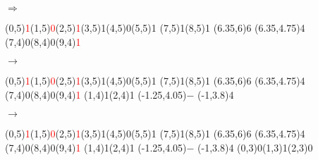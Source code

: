 \documentclass[11pt,a4paper]{article}
\begin{document}
\begin{center}
\begin{table}[ht!]
\begin{minipage}{0.1\textwidth}
$ \Rightarrow $

  \end{minipage}
\end{table}


\begin{table}[ht!]
  \centering
  \begin{minipage}{0.15\textwidth}

\par\vspace{6\oplineheight}
\oplput(0,5){\textcolor{red}{1}}\oplput(1,5){\textcolor{red}{0}}\oplput(2,5){\textcolor{red}{1}}\oplput(3,5){1}\oplput(4,5){0}\oplput(5,5){1}
\oplput(7,5){1}\oplput(8,5){1}
\opvline(6.35,6){6}
\ophline(6.35,4.75){4}
\oplput(7,4){0}\oplput(8,4){0}\oplput(9,4){\textcolor{red}{1}}

  \end{minipage}
  \hfillx
  \begin{minipage}{0.1\textwidth}
    \centering

$ \rightarrow $

  \end{minipage}
  \hfillx
  \begin{minipage}{0.15\textwidth}

\par\vspace{6\oplineheight}
\oplput(0,5){\textcolor{red}{1}}\oplput(1,5){\textcolor{red}{0}}\oplput(2,5){\textcolor{red}{1}}\oplput(3,5){1}\oplput(4,5){0}\oplput(5,5){1}
\oplput(7,5){1}\oplput(8,5){1}
\opvline(6.35,6){6}
\ophline(6.35,4.75){4}
\oplput(7,4){0}\oplput(8,4){0}\oplput(9,4){\textcolor{red}{1}}
\oplput(1,4){1}\oplput(2,4){1}
\oplput(-1.25,4.05){$-$}
\ophline(-1,3.8){4}

  \end{minipage}
  \hfillx
  \begin{minipage}{0.1\textwidth}
    \centering

$ \rightarrow $

  \end{minipage}
  \hfillx
  \begin{minipage}{0.15\textwidth}

\par\vspace{6\oplineheight}
\oplput(0,5){\textcolor{red}{1}}\oplput(1,5){\textcolor{red}{0}}\oplput(2,5){\textcolor{red}{1}}\oplput(3,5){1}\oplput(4,5){0}\oplput(5,5){1}
\oplput(7,5){1}\oplput(8,5){1}
\opvline(6.35,6){6}
\ophline(6.35,4.75){4}
\oplput(7,4){0}\oplput(8,4){0}\oplput(9,4){\textcolor{red}{1}}
\oplput(1,4){1}\oplput(2,4){1}
\oplput(-1.25,4.05){$-$}
\ophline(-1,3.8){4}
\oplput(0,3){0}\oplput(1,3){1}\oplput(2,3){0}


\end{minipage}
\end{table}
\end{center}
\end{document}
